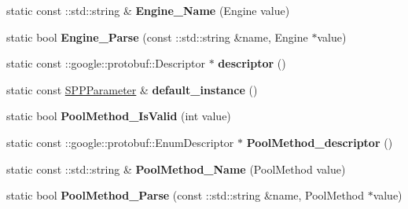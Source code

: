 \begin{DoxyCompactItemize}
\item 
\mbox{\label{classcaffe_1_1_s_p_p_parameter_a245a4a4d58f645ed00f250afd33286d1}} 
static const \+::std\+::string \& {\bfseries Engine\+\_\+\+Name} (Engine value)
\item 
\mbox{\label{classcaffe_1_1_s_p_p_parameter_ad9c1728b5d96adf0d45e799e4bbe7774}} 
static bool {\bfseries Engine\+\_\+\+Parse} (const \+::std\+::string \&name, Engine $\ast$value)
\item 
\mbox{\label{classcaffe_1_1_s_p_p_parameter_a6c0b466f196433bd34d74c06c7f88136}} 
static const \+::google\+::protobuf\+::\+Descriptor $\ast$ {\bfseries descriptor} ()
\item 
\mbox{\label{classcaffe_1_1_s_p_p_parameter_a10b1047b71da65caf968e42cb2b0d3e1}} 
static const \mbox{\hyperlink{classcaffe_1_1_s_p_p_parameter}{S\+P\+P\+Parameter}} \& {\bfseries default\+\_\+instance} ()
\item 
\mbox{\label{classcaffe_1_1_s_p_p_parameter_a419ee653304448688b4083acbe24c1ed}} 
static bool {\bfseries Pool\+Method\+\_\+\+Is\+Valid} (int value)
\item 
\mbox{\label{classcaffe_1_1_s_p_p_parameter_a32091c4517f26d2fadd8cf3c6e4b2dc7}} 
static const \+::google\+::protobuf\+::\+Enum\+Descriptor $\ast$ {\bfseries Pool\+Method\+\_\+descriptor} ()
\item 
\mbox{\label{classcaffe_1_1_s_p_p_parameter_a99d331ad14dd1fcc76c480e4becb3059}} 
static const \+::std\+::string \& {\bfseries Pool\+Method\+\_\+\+Name} (Pool\+Method value)
\item 
\mbox{\label{classcaffe_1_1_s_p_p_parameter_a438e4a3d2e709e467c41b9e35c7a6986}} 
static bool {\bfseries Pool\+Method\+\_\+\+Parse} (const \+::std\+::string \&name, Pool\+Method $\ast$value)
\item 
\mbox{\label{classcaffe_1_1_s_p_p_parameter_a908e88b1a56df1e26deb4726c293a1ed}} 

\end{DoxyCompactItemize}
